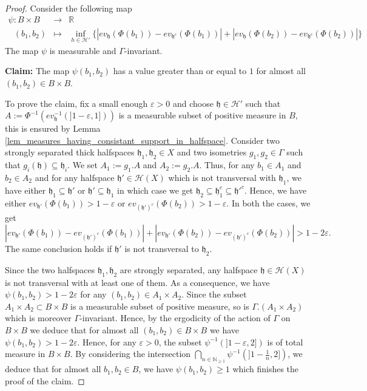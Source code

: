 \documentclass{amsart}
\numberwithin{equation}{section}
\newcommand{\HH}{\mathcal{H}}     %
\newcommand{\hh}{\mathfrak{h}}    %
\newcommand{\RR}{\mathbb{R}}      %
\newcommand{\NN}{\mathbb{N}}      %
\theoremstyle{definition}
\begin{document}
\begin{proof}%
        Consider the following map
        \begin{eqnarray*}
            \psi: B\times B &\rightarrow& \RR\\
            \ \ \ (b_1,b_2)&\mapsto& \inf_{h\in\HH'}{\{|ev_\hh(\Phi(b_1))-ev_{\hh^c}(\Phi(b_1))|+|ev_\hh(\Phi(b_2))-ev_{\hh^c}(\Phi(b_2))|\}}
        \end{eqnarray*}
        The map $\psi$ is measurable and $\Gamma$-invariant. \par 
        \textbf{Claim:} The map $\psi(b_1,b_2)$ has a value greater than or equal to $1$ for almost all $(b_1,b_2)\in B\times B$. \par 
        To prove the claim, fix a small enough $\varepsilon>0$ and choose $\hh\in\HH'$ such that $A:=\Phi^{-1}(ev_\hh^{-1}(]1-\varepsilon, 1]))$ is a measurable subset of positive measure in $B$, this is ensured by Lemma \ref{lem_measures_having_consistant_support_in_halfspace}. Consider two strongly separated thick halfspaces $\hh_1,\hh_2\in X$ and two isometries $g_1,g_2\in \Gamma$ such that $g_i(\hh)\subseteq \hh_i$. We set $A_1:=g_1.A$ and $A_2:=g_2.A$. Thus, for any $b_1\in A_1$ and $b_2\in A_2$ and for any halfspace $\hh' \in\HH(X)$ which is not transversal with $\hh_1$, we have either $\hh_1\subseteq \hh'$ or $\hh'\subseteq \hh_1$ in which case we get $\hh_2\subseteq \hh_1^c\subseteq \hh'^c$. Hence, we have either $ev_{\hh'}(\Phi(b_1))>1-\varepsilon$ or $ev_{(\hh')^c}(\Phi(b_2))>1-\varepsilon$. In both the cases, we get 
        \[
        |ev_{\hh'}(\Phi(b_1))-ev_{(\hh')^c}(\Phi(b_1))|+|ev_{\hh'}(\Phi(b_2))-ev_{(\hh')^c}(\Phi(b_2))|>1-2\varepsilon.
        \]
        The same conclusion holds if $\hh'$ is not transversal to $\hh_2$.
        \par 
        Since the two halfspaces $\hh_1,\hh_2$ are strongly separated, any halfspace $\hh\in \HH(X) $ is not transversal with at least one of them. As a consequence, we have $\psi(b_1,b_2)>1-2\varepsilon$ for any $(b_1,b_2)\in A_1\times A_2$. Since the subset $A_1\times A_2 \subset B\times B$ is a measurable subset of positive measure, so is $\Gamma.(A_1\times A_2)$ which is moreover $\Gamma$-invariant. Hence, by the ergodicity of the action of $\Gamma$ on $B\times B$ we deduce that for almost all $(b_1,b_2)\in B\times B$ we have $\psi(b_1,b_2)>1-2\varepsilon$. Hence, for any $\varepsilon > 0$, the subset $\psi^{-1}(]1-\varepsilon,2])$ is of total measure in $B\times B$. By considering the intersection $\displaystyle{\bigcap_{n\in\NN_{\geq 1}}\psi^{-1}(]1-\frac{1}{n},2])}$, we deduce that for almost all $b_1,b_2\in B$, we have $\psi(b_1,b_2)\geq 1$ which finishes the proof of the claim.
        

\end{proof}
\end{document}
